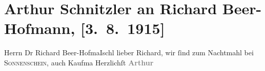 

         
         \renewcommand{\erwaehntePersonen}{Personen: Richard Beer-Hofmann, Arthur Kaufmann}
         \renewcommand{\erwaehnteOrte}{Orte: Bad Ischl, Restaurant Sonnenschein}
         \renewcommand{\erwaehnteWerke}{}
               \section[Arthur Schnitzler an Richard Beer-Hofmann, {[}3. 8. 1915{]}]{ Arthur Schnitzler an Richard Beer-Hofmann, {[}3. 8. 1915{]}}\nopagebreak{}\rehead{ }\begin{ledgroupsized}[t]{13cm}\normalsize\beginnumbering \toendnotes[C]{\smallbreak\pagebreak[2]} 
\pstart{}{\pb}Herrn Dr Richard Beer-Hofma{\geminationn}\pend{}\pstart{}Ischl\pend{}{\bigskip}\pstart
           \noindent{}{\pb}lieber Richard, wir ſind zum Nachtmahl bei \textsc{Sonnenschein}, auch Kaufma{\geminationn}\pend
           \pstart {\pb}Herzlichſt\pend{}\pstart
           \centering{}\textcolor{gray}{\textbf{ Arthur }}\pend
           
         
         \endnumbering{}\end{ledgroupsized}  \newcommand{\dateiname}{L02217}\newcommand{\titel}{Arthur Schnitzler an Richard Beer-Hofmann, [3. 8. 1915]}\newcommand{\editorInnen}{Martin Anton Müller und Gerd-Hermann Susen}
      